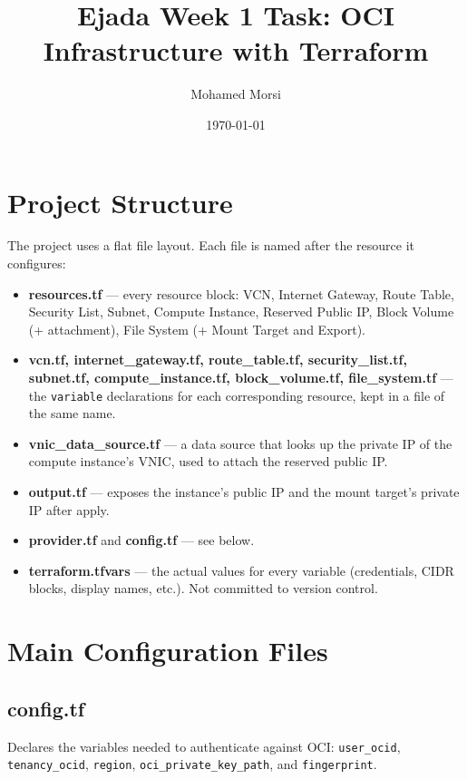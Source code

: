 \documentclass[11pt,a4paper]{article}
\title{Ejada Week 1 Task: OCI Infrastructure with Terraform}
\author{Mohamed Morsi}
\date{\today}
\begin{document}
\maketitle
\thispagestyle{empty}
\newpage

\section{Project Structure}

The project uses a flat file layout. Each file is named after the resource it configures:

\begin{itemize}
    \item \textbf{resources.tf} --- every resource block: VCN, Internet Gateway, Route Table, Security List, Subnet, Compute Instance, Reserved Public IP, Block Volume (+ attachment), File System (+ Mount Target and Export).
    \item \textbf{vcn.tf, internet\_gateway.tf, route\_table.tf, security\_list.tf, subnet.tf, compute\_instance.tf, block\_volume.tf, file\_system.tf} --- the \texttt{variable} declarations for each corresponding resource, kept in a file of the same name.
    \item \textbf{vnic\_data\_source.tf} --- a data source that looks up the private IP of the compute instance's VNIC, used to attach the reserved public IP.
    \item \textbf{output.tf} --- exposes the instance's public IP and the mount target's private IP after apply.
    \item \textbf{provider.tf} and \textbf{config.tf} --- see below.
    \item \textbf{terraform.tfvars} --- the actual values for every variable (credentials, CIDR blocks, display names, etc.). Not committed to version control.
\end{itemize}

\section{Main Configuration Files}

\subsection*{config.tf}
Declares the variables needed to authenticate against OCI: \texttt{user\_ocid}, \texttt{tenancy\_ocid}, \texttt{region}, \texttt{oci\_private\_key\_path}, and \texttt{fingerprint}.
\end{document}
